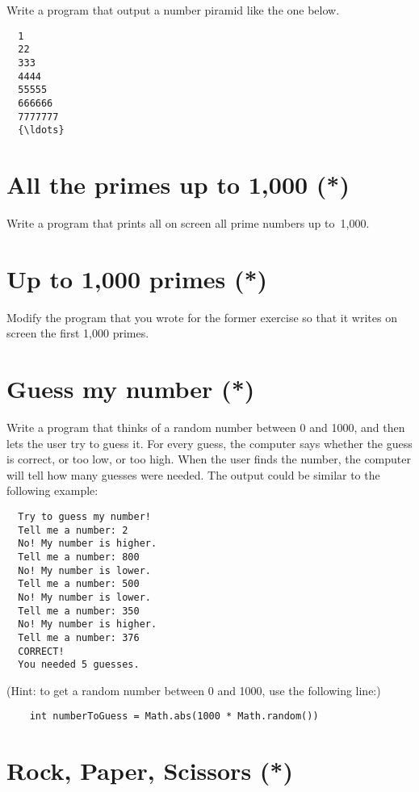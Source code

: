 \documentclass{article}
\begin{document}
Write a program that output a number piramid like the one below. 

\begin{verbatim}
  1
  22
  333
  4444
  55555
  666666
  7777777
  {\ldots} 
\end{verbatim}

\section{All the primes up to 1,000 (*)}
\label{sec:all-primes-up}

Write a program that prints all on screen all prime numbers up
to~1,000. 

\section{Up to 1,000 primes (*)}
\label{sec:all-primes-uprr}

Modify the program that you wrote for the former exercise so that it
writes on screen the first 1,000 primes. 

\section{Guess my number (*)}
\label{sec:guess-my-number}

Write a program that thinks of a random number between 0 and 1000, and
then lets the user try to guess it. For every guess, the computer says
whether the guess is correct, or too low, or too high. When the user
finds the number, the computer will tell how many guesses were
needed. The output could be similar to the following example: 

\begin{verbatim}
  Try to guess my number!
  Tell me a number: 2
  No! My number is higher. 
  Tell me a number: 800
  No! My number is lower.
  Tell me a number: 500
  No! My number is lower.
  Tell me a number: 350
  No! My number is higher.
  Tell me a number: 376
  CORRECT!
  You needed 5 guesses. 
\end{verbatim}

(Hint: to get a random number between 0 and 1000, use the following
line:)

\begin{verbatim}
    int numberToGuess = Math.abs(1000 * Math.random())
\end{verbatim}

\section{Rock, Paper, Scissors (*)}
\label{sec:rock-paper-scissors}
\end{document}
